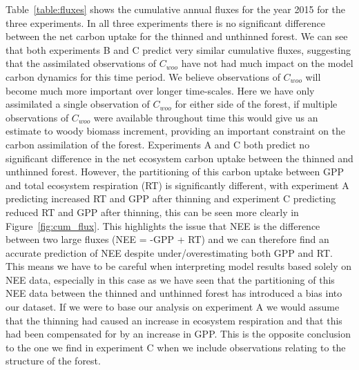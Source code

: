 \documentclass[draft,linenumbers]{agujournal}
\begin{document}
Table~\ref{table:fluxes} shows the cumulative annual fluxes for the year 2015 for the three experiments. In all three experiments there is no significant difference between the net carbon uptake for the thinned and unthinned forest. We can see that both experiments B and C predict very similar cumulative fluxes, suggesting that the assimilated observations of \(C_{woo}\) have not had much impact on the model carbon dynamics for this time period. We believe observations of \(C_{woo}\) will become much more important over longer time-scales. Here we have only assimilated a single observation of \(C_{woo}\) for either side of the forest, if multiple observations of \(C_{woo}\) were available throughout time this would give us an estimate to woody biomass increment, providing an important constraint on the carbon assimilation of the forest. Experiments A and C both predict no significant difference in the net ecosystem carbon uptake between the thinned and unthinned forest. However, the partitioning of this carbon uptake between GPP and total ecosystem respiration (RT) is significantly different, with experiment A predicting increased RT and GPP after thinning and experiment C predicting reduced RT and GPP after thinning, this can be seen more clearly in Figure~\ref{fig:cum_flux}. This highlights the issue that NEE is the difference between two large fluxes (NEE = -GPP + RT) and we can therefore find an accurate prediction of NEE despite under/overestimating both GPP and RT. This means we have to be careful when interpreting model results based solely on NEE data, especially in this case as we have seen that the partitioning of this NEE data between the thinned and unthinned forest has introduced a bias into our dataset. If we were to base our analysis on experiment A we would assume that the thinning had caused an increase in ecosystem respiration and that this had been compensated for by an increase in GPP. This is the opposite conclusion to the one we find in experiment C when we include observations relating to the structure of the forest. 
\end{document}
